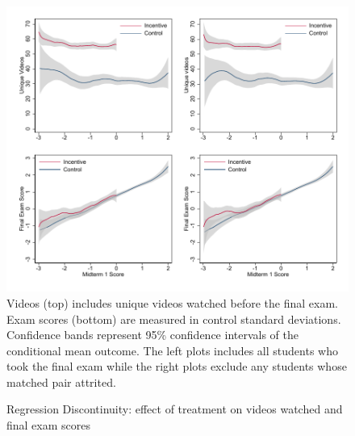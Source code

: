 \documentclass[12pt]{article}
\begin{document}
\clearpage
\begin{figure}[t]
\begin{center}
\caption{Regression Discontinuity: effect of treatment on videos watched and final exam scores}
\label{rdfinal}
\includegraphics[width=1\textwidth, angle=0]{../plots/lpolyfinal.pdf}
\footnotesize Videos (top) includes unique videos watched before the final exam. Exam scores (bottom) are measured in control standard deviations. Confidence bands represent 95\% confidence intervals of the conditional mean outcome. The left plots includes all students who took the final exam while the right plots exclude any students whose matched pair attrited.
\end{center}
\end{figure}
\end{document}
